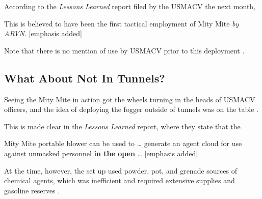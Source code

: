 \documentclass[
  11pt,
  titlepage]{krantz}
\renewenvironment{quote}{\begin{VF}}{\end{VF}}
\begin{document}
According to the \emph{Lessons Learned} report filed by the USMACV the next month,

\begin{quote}
This is believed to have been the first tactical employment of Mity Mite \emph{by ARVN}. {[}emphasis added{]}

\end{quote}

Note that there is no mention of use by USMACV prior to this deployment \citep{USMACV1965}.

\hypertarget{what-about-not-in-tunnels}{%
\subsection*{What About Not In Tunnels?}\label{what-about-not-in-tunnels}}


Seeing the Mity Mite in action got the wheels turning in the heads of USMACV officers, and the idea of deploying the fogger outside of tunnels was on the table \citep{USMACV1965}.

This is made clear in the \emph{Lessons Learned} report, where they state that the

\begin{quote}
Mity Mite portable blower can be used to \ldots{} generate an agent cloud for use against unmasked personnel \textbf{in the open} \ldots{} {[}emphasis added{]}

\end{quote}

At the time, however, the set up used powder, pot, and grenade sources of chemical agents, which was inefficient and required extensive supplies and gasoline reserves \citep{USMACV1965}.
\end{document}
